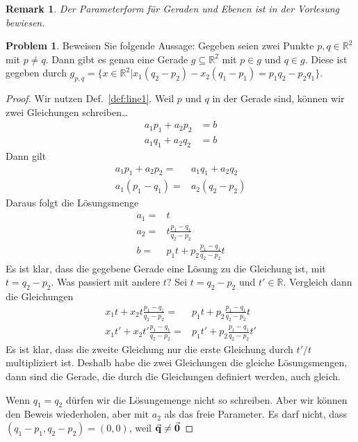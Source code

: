 \documentclass[prb,12pt]{revtex4-2}
\newtheorem{Remark}[Theorem]{Remark}
\theoremstyle{definition}
\newtheorem{Problem}{Problem}
\theoremstyle{definition}
\newcommand{\R}{\mathbb{R}}
\begin{document}
\begin{Remark}
	Der Parameterform f\"{u}r Geraden und Ebenen ist in der Vorlesung bewiesen.
\end{Remark}
\begin{Problem}\label{pr:linalg1-3}
	Beweisen Sie folgende Aussage:
Gegeben seien zwei Punkte $p, q \in \R^2$ mit $p \neq  q$. Dann gibt es genau eine Gerade $g \subseteq \R^2$ mit $p \in g$ und $q \in g$. Diese ist gegeben durch $g_{p,q} = \{x \in \R^2 |x_1 (q_2 - p_2 ) - x_2(q_1 - p_1 ) = p_1q_2-  p_2q_1\}$.
\end{Problem}

\begin{proof}
	Wir nutzen Def.~\ref{def:line1}. Weil $p$ und $q$ in der Gerade sind, können wir zwei Gleichungen schreiben\ldots
	\begin{align*}
		a_1p_1+a_2p_2&=b\\
		a_1q_1+a_2q_2&=b
	\end{align*}
	Dann gilt
	\begin{align*}
		a_1p_1+a_2p_2=& a_1q_1+a_2q_2\\
		a_1(p_1-q_1)=& a_2(q_2-p_2)
	\end{align*}
	Daraus folgt die L\"{o}sungsmenge
	\begin{align*}
		a_1=&t\\
		a_2=&t\frac{p_1-q_1}{q_2-p_2}\\
		b=&p_1t+p_2\frac{p_1-q_1}{q_2-p_2}t
	\end{align*}
	Es ist klar, dass die gegebene Gerade eine Lösung zu die Gleichung ist, mit $t=q_2-p_2$. Was passiert mit andere $t$? Sei $t=q_2-p_2$ und $t'\in \R$. Vergleich dann die Gleichungen
	\begin{align*}
		x_1t+x_2t\frac{p_1-q_1}{q_2-p_2}=&p_1t+p_2\frac{p_1-q_1}{q_2-p_2}t\\
		x_1t'+x_2t'\frac{p_1-q_1}{q_2-p_2}=&p_1t'+p_2\frac{p_1-q_1}{q_2-p_2}t'
	\end{align*}
	Es ist klar, dass die zweite Gleichung nur die erste Gleichung durch $t' / t$ multipliziert ist. Deshalb habe die zwei Gleichungen die gleiche Lösungsmengen, dann sind die Gerade, die durch die Gleichungen definiert werden, auch gleich.

Wenn $q_1=q_2$ d\"{u}rfen wir die L\"{o}sungemenge nicht so schreiben. Aber wir k\"{o}nnen den Beweis wiederholen, aber mit $a_2$ als das freie Parameter. Es darf nicht, dass $\left( q_1-p_1,q_2-p_2 \right) =(0,0)$, weil $\va q\neq \va 0$
\end{proof}
\end{document}

